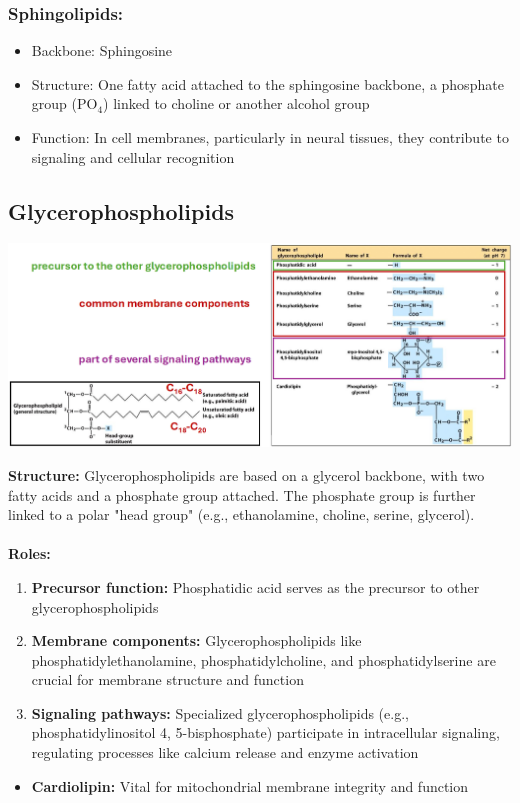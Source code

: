 \documentclass[10pt]{article}
\begin{document}
\subsubsection*{Sphingolipids:}
\begin{itemize}
    \item Backbone: Sphingosine
    \item Structure: One fatty acid attached to the sphingosine backbone, a phosphate group (PO$_4$) linked to choline or another alcohol group
    \item Function: In cell membranes, particularly in neural tissues, they contribute to signaling and cellular recognition
\end{itemize}

\subsection*{Glycerophospholipids}
\begin{center}
    \includegraphics*[width=\textwidth]{L3_8.png}
\end{center}
\textbf{Structure:}  Glycerophospholipids are based on a glycerol backbone, with two fatty acids and a phosphate group attached.  The phosphate group is further linked to a polar "head group" (e.g., ethanolamine, choline, serine, glycerol).\\\\
\textbf{Roles:}
\begin{enumerate}
    \item \textbf{Precursor function:} Phosphatidic acid serves as the precursor to other glycerophospholipids
    \item \textbf{Membrane components:} Glycerophospholipids like phosphatidylethanolamine, phosphatidylcholine, and phosphatidylserine are crucial for membrane structure and function
    \item \textbf{Signaling pathways:} Specialized glycerophospholipids (e.g., phosphatidylinositol 4, 5-bisphosphate) participate in intracellular signaling, regulating processes like calcium release and enzyme activation
\end{enumerate}
\begin{itemize}
    \item \textbf{Cardiolipin:} Vital for mitochondrial membrane integrity and function
\end{itemize}
\end{document}
